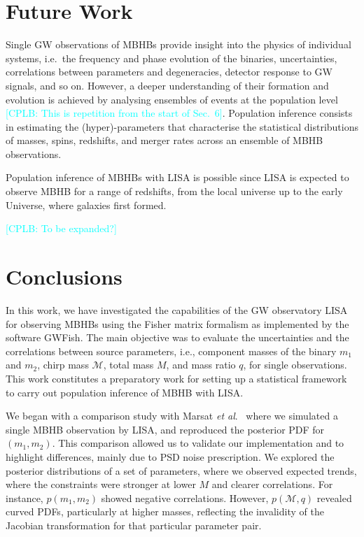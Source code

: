 \documentclass[a4paper,12pt]{article}
\newcommand{\cplb}[1]{\textcolor{cyan}{[CPLB: #1]}}
\begin{document}
\section{Future Work}
\label{sec:futurework}

Single GW observations of MBHBs provide insight into the physics of individual systems, i.e.\ the frequency and phase evolution of the binaries, uncertainties, correlations between parameters and degeneracies, detector response to GW signals, and so on. However, a deeper understanding of their formation and evolution is achieved by analysing ensembles of events at the population level \cplb{This is repetition from the start of Sec.~6}. Population inference consists in estimating the (hyper)-parameters that characterise the statistical distributions of masses, spins, redshifts, and merger rates across an ensemble of MBHB observations.

Population inference of MBHBs with LISA is possible since LISA is expected to observe MBHB for a range of redshifts, from the local universe up to the early Universe, where galaxies first formed. 

\cplb{To be expanded?}

\section{Conclusions}
\label{sec:conclusions}

In this work, we have investigated the capabilities of the GW observatory LISA for observing MBHBs using the Fisher matrix formalism as implemented by the software GWFish. The main objective was to evaluate the uncertainties and the correlations between source parameters, i.e., component masses of the binary $m_1$ and $m_2$, chirp mass $\mathcal{M}$, total mass $M$, and mass ratio $q$, for single observations. This work constitutes a preparatory work for setting up a statistical framework to carry out population inference of MBHB with LISA.

We began with a comparison study with Marsat \textit{et al}.\ \cite{marsat2021exploring} where we simulated a single MBHB observation by LISA, and reproduced the posterior PDF for $(m_1,m_2)$. This comparison allowed us to validate our implementation and to highlight differences, mainly due to PSD noise prescription. We explored the posterior distributions of a set of parameters, where we observed expected trends, where the constraints were stronger at lower $M$ and clearer correlations. For instance, $p(m_1,m_2)$ showed negative correlations. However, $p(\mathcal{M},q)$ revealed curved PDFs, particularly at higher masses, reflecting the invalidity of the Jacobian transformation for that particular parameter pair.
\end{document}

